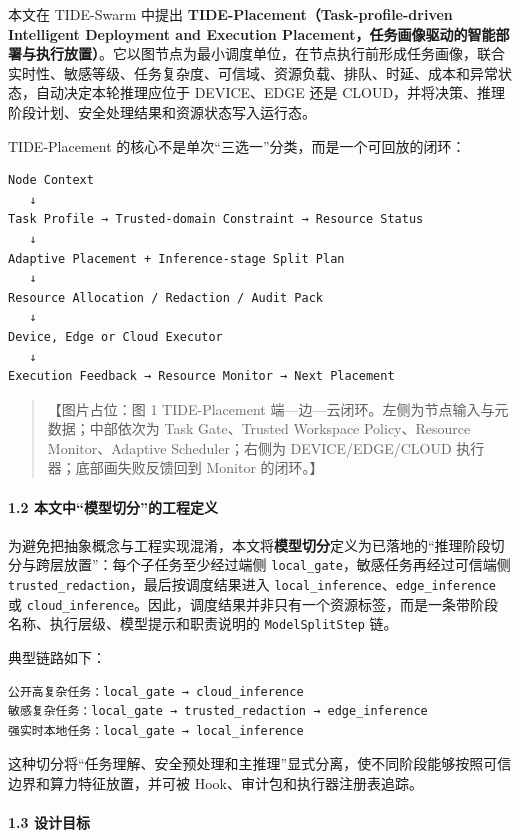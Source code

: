 \documentclass[UTF8,a4paper,12pt]{ctexart}
\begin{document}
本文在 TIDE-Swarm 中提出 \textbf{TIDE-Placement（Task-profile-driven Intelligent Deployment and Execution Placement，任务画像驱动的智能部署与执行放置）}。它以图节点为最小调度单位，在节点执行前形成任务画像，联合实时性、敏感等级、任务复杂度、可信域、资源负载、排队、时延、成本和异常状态，自动决定本轮推理应位于 DEVICE、EDGE 还是 CLOUD，并将决策、推理阶段计划、安全处理结果和资源状态写入运行态。

TIDE-Placement 的核心不是单次``三选一''分类，而是一个可回放的闭环：

\begin{verbatim}
Node Context
   ↓
Task Profile → Trusted-domain Constraint → Resource Status
   ↓
Adaptive Placement + Inference-stage Split Plan
   ↓
Resource Allocation / Redaction / Audit Pack
   ↓
Device, Edge or Cloud Executor
   ↓
Execution Feedback → Resource Monitor → Next Placement
\end{verbatim}

\begin{quote}
【图片占位：图 1 TIDE-Placement 端—边—云闭环。左侧为节点输入与元数据；中部依次为 Task Gate、Trusted Workspace Policy、Resource Monitor、Adaptive Scheduler；右侧为 DEVICE/EDGE/CLOUD 执行器；底部画失败反馈回到 Monitor 的闭环。】
\end{quote}

\paragraph{1.2 本文中``模型切分''的工程定义}

为避免把抽象概念与工程实现混淆，本文将\textbf{模型切分}定义为已落地的``推理阶段切分与跨层放置''：每个子任务至少经过端侧 \texttt{local\_gate}，敏感任务再经过可信端侧 \texttt{trusted\_redaction}，最后按调度结果进入 \texttt{local\_inference}、\texttt{edge\_inference} 或 \texttt{cloud\_inference}。因此，调度结果并非只有一个资源标签，而是一条带阶段名称、执行层级、模型提示和职责说明的 \texttt{ModelSplitStep} 链。

典型链路如下：

\begin{verbatim}
公开高复杂任务：local_gate → cloud_inference
敏感复杂任务：local_gate → trusted_redaction → edge_inference
强实时本地任务：local_gate → local_inference
\end{verbatim}

这种切分将``任务理解、安全预处理和主推理''显式分离，使不同阶段能够按照可信边界和算力特征放置，并可被 Hook、审计包和执行器注册表追踪。

\paragraph{1.3 设计目标}
\end{document}
